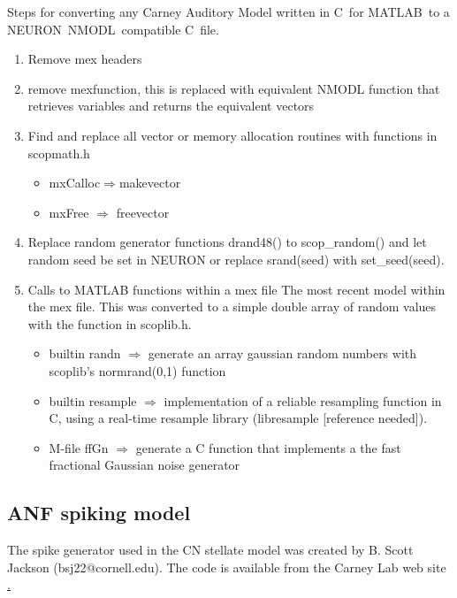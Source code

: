 
Steps for converting any Carney Auditory Model written in C~for MATLAB~to a NEURON~NMODL~compatible C~file.
\begin{enumerate}
\item Remove mex headers
\item remove \textsf{mexfunction}, this is replaced with equivalent NMODL function that retrieves variables and returns the equivalent vectors
\item Find and replace all vector or memory allocation routines with functions in scopmath.h
  \begin{itemize}
  \item \textsf{mxCalloc}$\Rightarrow$\textsf{makevector}
  \item \textsf{mxFree} $\Rightarrow$ \textsf{freevector}
  \end{itemize}
\item Replace random generator functions \textsf{drand48()} to \mbox{\textsf{scop\_random()}} and let random seed be set in NEURON or replace \textsf{srand(seed)} with \mbox{\textsf{set\_seed(seed)}}.
\item Calls to MATLAB functions within a mex file The most recent model within the mex file.  This was converted to a simple double array of random values with the  function in \mbox{\textsf{scoplib.h}}.
  \begin{itemize}
  \item builtin \textsf{randn} $\Rightarrow$ generate an array gaussian random numbers with scoplib's \mbox{\textsf{normrand(0,1)}} function
  \item builtin \textsf{resample} $\Rightarrow$ implementation of a reliable resampling function in C, using a real-time resample library (libresample [reference needed]).
  \item M-file \textsf{ffGn} $\Rightarrow$ generate a C function that implements a the fast fractional Gaussian noise generator
  \end{itemize}
\end{enumerate}


\subsection[Spiking model]{ANF spiking model}

The spike generator used in the CN stellate model was created by B. Scott Jackson (bsj22@cornell.edu). 
The code is available from the Carney Lab web site \href{http://www.urmc.rochester.edu/smd/Nanat/faculty-research/lab-pages/LaurelCarney/auditory-models.cfm}.

